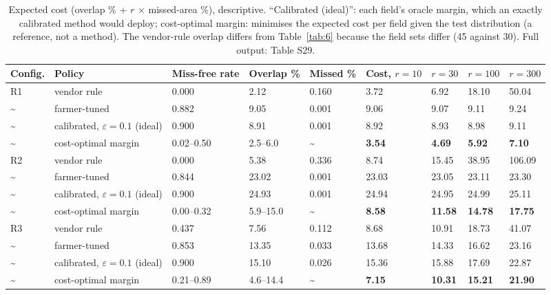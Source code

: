 \documentclass[preprint,12pt,authoryear]{elsarticle}
\begin{document}
\begin{table}[!htbp]
\centering
\scriptsize
\caption{Expected cost (overlap \% + \(r\) × missed-area \%), descriptive. ``Calibrated (ideal)'': each field's oracle margin, which an exactly calibrated method would deploy; cost-optimal margin: minimises the expected cost per field given the test distribution (a reference, not a method). The vendor-rule overlap differs from Table~\ref{tab:6} because the field sets differ (45 against 30). Full output: Table S29.}\label{tab:9}
\begin{adjustbox}{max width=\textwidth}
\begin{tabular}{@{}lllllllll@{}}
\toprule
\textbf{Config.} & \textbf{Policy} & \textbf{Miss-free rate} & \textbf{Overlap \%} & \textbf{Missed \%} & \textbf{Cost, \(r=10\)} & \textbf{\(r=30\)} & \textbf{\(r=100\)} & \textbf{\(r=300\)} \\
\midrule
R1 & vendor rule & 0.000 & 2.12 & 0.160 & 3.72 & 6.92 & 18.10 & 50.04 \\
\textasciitilde{} & farmer-tuned & 0.882 & 9.05 & 0.001 & 9.06 & 9.07 & 9.11 & 9.24 \\
\textasciitilde{} & calibrated, \(\varepsilon=0.1\) (ideal) & 0.900 & 8.91 & 0.001 & 8.92 & 8.93 & 8.98 & 9.11 \\
\textasciitilde{} & cost-optimal margin & 0.02--0.50 & 2.5--6.0 & \textasciitilde{} & \textbf{3.54} & \textbf{4.69} & \textbf{5.92} & \textbf{7.10} \\
R2 & vendor rule & 0.000 & 5.38 & 0.336 & 8.74 & 15.45 & 38.95 & 106.09 \\
\textasciitilde{} & farmer-tuned & 0.844 & 23.02 & 0.001 & 23.03 & 23.05 & 23.11 & 23.30 \\
\textasciitilde{} & calibrated, \(\varepsilon=0.1\) (ideal) & 0.900 & 24.93 & 0.001 & 24.94 & 24.95 & 24.99 & 25.11 \\
\textasciitilde{} & cost-optimal margin & 0.00--0.32 & 5.9--15.0 & \textasciitilde{} & \textbf{8.58} & \textbf{11.58} & \textbf{14.78} & \textbf{17.75} \\
R3 & vendor rule & 0.437 & 7.56 & 0.112 & 8.68 & 10.91 & 18.73 & 41.07 \\
\textasciitilde{} & farmer-tuned & 0.853 & 13.35 & 0.033 & 13.68 & 14.33 & 16.62 & 23.16 \\
\textasciitilde{} & calibrated, \(\varepsilon=0.1\) (ideal) & 0.900 & 15.10 & 0.026 & 15.36 & 15.88 & 17.69 & 22.87 \\
\textasciitilde{} & cost-optimal margin & 0.21--0.89 & 4.6--14.4 & \textasciitilde{} & \textbf{7.15} & \textbf{10.31} & \textbf{15.21} & \textbf{21.90} \\
\bottomrule
\end{tabular}
\end{adjustbox}
\end{table}
\end{document}
